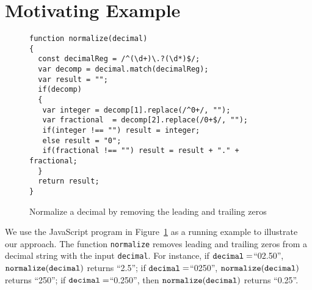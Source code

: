 
\section{Motivating Example}\label{sec:mot}

\begin{figure}[htbp]
\begin{center}
\begin{verbatim}
function normalize(decimal)
{
  const decimalReg = /^(\d+)\.?(\d*)$/;
  var decomp = decimal.match(decimalReg);
  var result = "";
  if(decomp)
  {
   var integer = decomp[1].replace(/^0+/, "");
   var fractional  = decomp[2].replace(/0+$/, "");
   if(integer !== "") result = integer;
   else result = "0"; 
   if(fractional !== "") result = result + "." + fractional;
  }
  return result;
}
\end{verbatim}
\end{center}
\vspace{-8mm}
\caption{Normalize a decimal by removing the leading and trailing zeros}
\label{fig-run-exmp}
\end{figure}

We use the JavaScript program in Figure~\ref{fig-run-exmp} as a running example to illustrate our approach. The function {\tt normalize}   removes leading and trailing zeros from a decimal string with the input %
{\tt decimal}. For instance,  if $\tt{decimal} =$``02.50'', $\tt{normalize(decimal)}$ returns ``2.5''; if $\tt{decimal} =$``0250'', $\tt{normalize(decimal)}$ returns ``250''; if $\tt{decimal} =$``0.250'', then $\tt{normalize(decimal)}$ returns ``0.25''. 


